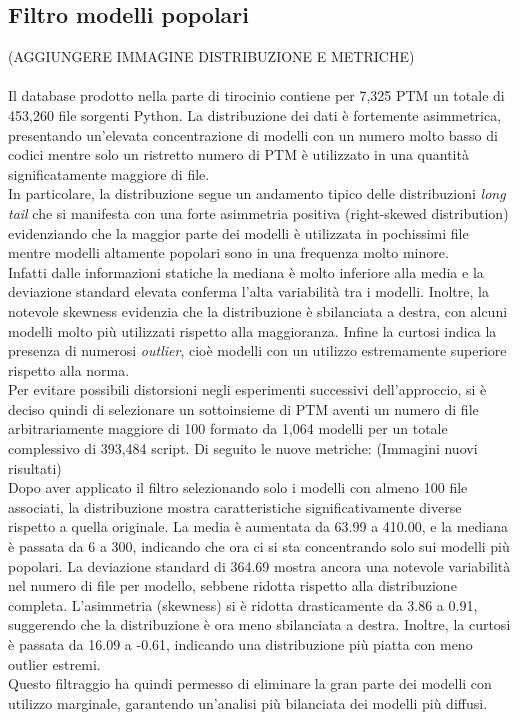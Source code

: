 \documentclass{article}
\begin{document}
\subsection{Filtro modelli popolari}
(AGGIUNGERE IMMAGINE DISTRIBUZIONE E METRICHE)\\
\\
Il database prodotto nella parte di tirocinio contiene per 7,325 PTM un totale di 453,260 file sorgenti Python. La distribuzione dei dati è fortemente asimmetrica, presentando un'elevata concentrazione di modelli con un numero molto basso di codici mentre solo un ristretto numero di PTM è utilizzato in una quantità significatamente maggiore di file.\\
In particolare, la distribuzione segue un andamento tipico delle distribuzioni \textit{long tail} che si manifesta con una forte asimmetria positiva (right-skewed distribution) evidenziando che la maggior parte dei modelli è utilizzata in pochissimi file mentre modelli altamente popolari sono in una frequenza molto minore.\\
Infatti dalle informazioni statiche la mediana è molto inferiore alla media e la deviazione standard elevata conferma l'alta variabilità tra i modelli. Inoltre, la notevole skewness evidenzia che la distribuzione è sbilanciata a destra, con alcuni modelli molto più utilizzati rispetto alla maggioranza. Infine la curtosi indica la presenza di numerosi \textit{outlier}, cioè modelli con un utilizzo estremamente superiore rispetto alla norma.\\
Per evitare possibili distorsioni negli esperimenti successivi dell'approccio, si è deciso quindi di selezionare un sottoinsieme di PTM aventi un numero di file arbitrariamente maggiore di 100 formato da 1,064 modelli per un totale complessivo di 393,484 script. Di seguito le nuove metriche:
(Immagini nuovi risultati)\\
Dopo aver applicato il filtro selezionando solo i modelli con almeno 100 file associati, la distribuzione mostra caratteristiche significativamente diverse rispetto a quella originale. La media è aumentata da 63.99 a 410.00, e la mediana è passata da 6 a 300, indicando che ora ci si sta concentrando solo sui modelli più popolari.
La deviazione standard di 364.69 mostra ancora una notevole variabilità nel numero di file per modello, sebbene ridotta rispetto alla distribuzione completa. L’asimmetria (skewness) si è ridotta drasticamente da 3.86 a 0.91, suggerendo che la distribuzione è ora meno sbilanciata a destra. Inoltre, la curtosi è passata da 16.09 a -0.61, indicando una distribuzione più piatta con meno outlier estremi.\\
Questo filtraggio ha quindi permesso di eliminare la gran parte dei modelli con utilizzo marginale, garantendo un'analisi più bilanciata dei modelli più diffusi.
\end{document}
